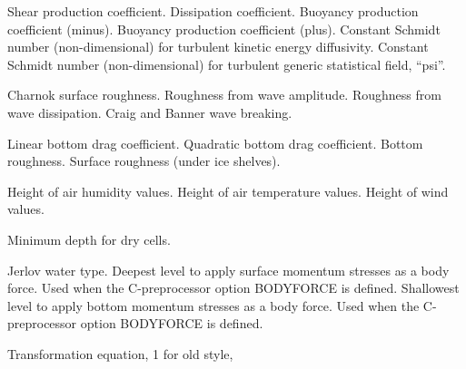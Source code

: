 \begin{klist}
\begin{klist}
          Shear production coefficient.
          Dissipation coefficient.
          Buoyancy production coefficient (minus).
          Buoyancy production coefficient (plus).
        Constant Schmidt number (non-dimensional) for
       turbulent kinetic energy diffusivity.
         Constant Schmidt number (non-dimensional) for
       turbulent generic statistical field, ``psi''.
     \end{klist}
    \mbox{}
     \begin{klist}
        Charnok surface roughness.
        Roughness from wave amplitude.
        Roughness from wave dissipation.
        Craig and Banner wave breaking.
     \end{klist}
    \mbox{}
     \begin{klist}
            Linear bottom drag coefficient.
           Quadratic bottom drag coefficient.
              Bottom roughness.
              Surface roughness (under ice shelves).
     \end{klist}
    \mbox{}
     \begin{klist}
        Height of air humidity values.
        Height of air temperature values.
        Height of wind values.
     \end{klist}
    \mbox{}
     \begin{klist}
         Minimum depth for dry cells.
     \end{klist}
    \mbox{}
     \begin{klist}
         Jerlov water type.
         Deepest level to apply surface momentum
     stresses as a body force.
            Used when the C-preprocessor option BODYFORCE is defined.
         Shallowest level to apply bottom momentum
    stresses as a body force.
            Used when the C-preprocessor option BODYFORCE is defined.
     \end{klist}
    \mbox{}
     \begin{klist}
        Transformation equation, 1 for old style,

\end{klist}
\end{klist}
